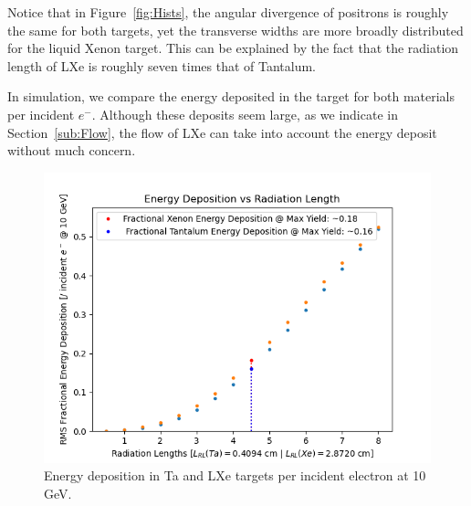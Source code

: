 \documentclass[%
reprint,
nofootinbib,
amsmath, amssymb,
aps,
floatfix,
]{revtex4-2}
\begin{document}
Notice that in Figure~\ref{fig:Hists}, the angular divergence of positrons is roughly the same for both targets,
yet the transverse widths are more broadly distributed for the liquid Xenon target.  This can be explained by the 
fact that the radiation length of LXe is roughly seven times that of Tantalum.

In simulation, we compare the energy deposited in the target for both materials per incident $e^-$.  Although
these deposits seem large, as we indicate in Section~\ref{sub:Flow}, the flow of LXe
can take into account the energy deposit without much concern.

\begin{figure}[H]
    \includegraphics[width = \linewidth]{../images/CompDeps.png}
    \caption{\label{fig:EDep}Energy deposition in Ta and LXe targets per incident electron at 10 GeV.}
\end{figure}

\end{document}
